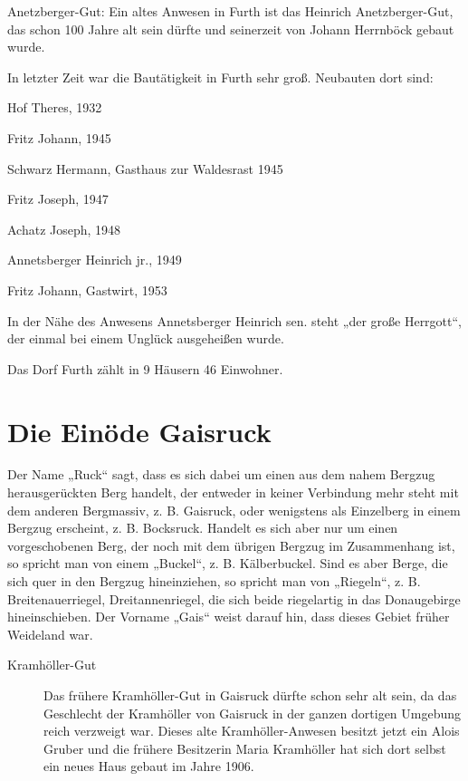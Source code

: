 \documentclass{book}
\begin{document}
Anetzberger-Gut: Ein altes Anwesen in Furth ist das Heinrich Anetzberger-Gut,
das schon 100 Jahre alt sein dürfte und seinerzeit von Johann Herrnböck gebaut
wurde.

In letzter Zeit war die Bautätigkeit in Furth sehr groß. Neubauten dort sind:

\begin{compactitem}
\item Hof Theres, 1932
\item Fritz Johann, 1945
\item Schwarz Hermann, Gasthaus zur Waldesrast 1945
\item Fritz Joseph, 1947
\item Achatz Joseph, 1948
\item Annetsberger Heinrich jr., 1949
\item Fritz Johann, Gastwirt, 1953
\end{compactitem}

In der Nähe des Anwesens Annetsberger Heinrich sen. steht „der große Herrgott“,
der einmal bei einem Unglück ausgeheißen wurde.

Das Dorf Furth zählt in 9 Häusern 46 Einwohner.

\section{Die Einöde Gaisruck}

Der Name „Ruck“ sagt, dass es sich dabei um einen aus dem nahem Bergzug
herausgerückten Berg handelt, der entweder in keiner Verbindung mehr steht mit
dem anderen Bergmassiv, z. B. Gaisruck, oder wenigstens als Einzelberg in einem
Bergzug erscheint, z. B. Bocksruck. Handelt es sich aber nur um einen
vorgeschobenen Berg, der noch mit dem übrigen Bergzug im Zusammenhang ist, so
spricht man von einem „Buckel“, z. B. Kälberbuckel. Sind es aber Berge, die sich
quer in den Bergzug hineinziehen, so spricht man von „Riegeln“, z. B.
Breitenauerriegel, Dreitannenriegel, die sich beide riegelartig in das
Donaugebirge hineinschieben. Der Vorname „Gais“ weist darauf hin, dass dieses
Gebiet früher Weideland war.

\begin{description}
\item[Kramhöller-Gut] Das frühere Kramhöller-Gut in Gaisruck dürfte schon sehr
alt sein, da das Geschlecht der Kramhöller von Gaisruck in der ganzen dortigen
Umgebung reich verzweigt war. Dieses alte Kramhöller-Anwesen besitzt jetzt ein
Alois Gruber und die frühere Besitzerin Maria Kramhöller hat sich dort selbst
ein neues Haus gebaut im Jahre 1906.
\end{description}
\end{document}
